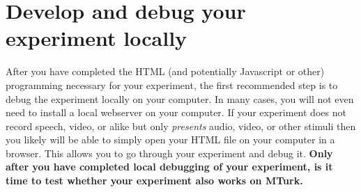 \documentclass{article}
\begin{document}
\section{Develop and debug your experiment locally}

After you have completed the HTML (and potentially Javascript or other) programming necessary for your experiment, the first recommended step is to debug the experiment locally on your computer. In many cases, you will not even need to install a local webserver on your computer. If your experiment does not record speech, video, or alike but only {\em presents} audio, video, or other stimuli then you likely will be able to simply open your HTML file on your computer in a browser. This allows you to go through your experiment and debug it. \textbf{Only after you have completed local debugging of your experiment, is it time to test whether your experiment also works on MTurk.}
\end{document}

